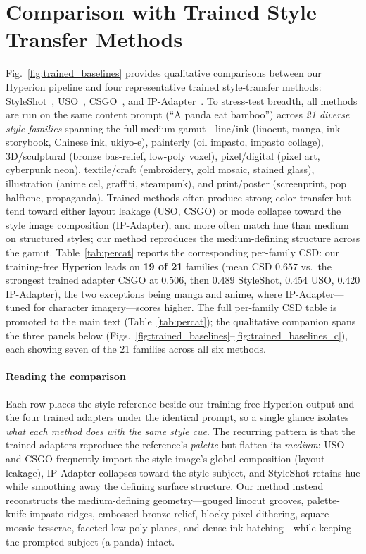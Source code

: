 \section{Comparison with Trained Style Transfer Methods}
\label{app:trained_baselines}

Fig.~\ref{fig:trained_baselines} provides qualitative comparisons between our
Hyperion pipeline and four representative trained style-transfer methods:
StyleShot~\cite{gao2024styleshot}, USO~\cite{wu2025uso},
CSGO~\cite{xing2024csgo}, and IP-Adapter~\cite{ipadapter2023}.
To stress-test breadth, all methods are run on the same content prompt
(``A panda eat bamboo'') across \emph{21 diverse style families} spanning the
full medium gamut---line/ink (linocut, manga, ink-storybook, Chinese ink,
ukiyo-e), painterly (oil impasto, impasto collage), 3D/sculptural (bronze
bas-relief, low-poly voxel), pixel/digital (pixel art, cyberpunk neon),
textile/craft (embroidery, gold mosaic, stained glass), illustration
(anime cel, graffiti, steampunk), and print/poster (screenprint, pop halftone,
propaganda).
Trained methods often produce strong color transfer but tend toward either
layout leakage (USO, CSGO) or mode collapse toward the style image composition
(IP-Adapter), and more often match hue than medium on structured styles; our
method reproduces the medium-defining structure across the gamut.
Table~\ref{tab:percat} reports the corresponding per-family CSD: our
training-free Hyperion leads on \textbf{19 of 21} families (mean CSD $0.657$
vs.\ the strongest trained adapter CSGO at $0.506$, then $0.489$ StyleShot,
$0.454$ USO, $0.420$ IP-Adapter),
the two exceptions being manga and anime, where IP-Adapter---tuned for
character imagery---scores higher. The full per-family CSD table is promoted to
the main text (Table~\ref{tab:percat}); the qualitative companion spans the
three panels below (Figs.~\ref{fig:trained_baselines}--\ref{fig:trained_baselines_c}),
each showing seven of the 21 families across all six methods.

\paragraph{Reading the comparison}
Each row places the style reference beside our training-free Hyperion output and
the four trained adapters under the identical prompt, so a single glance
isolates \emph{what each method does with the same style cue}. The recurring
pattern is that the trained adapters reproduce the reference's \emph{palette}
but flatten its \emph{medium}: USO and CSGO frequently import the style image's
global composition (layout leakage), IP-Adapter collapses toward the style
subject, and StyleShot retains hue while smoothing away the defining surface
structure. Our method instead reconstructs the medium-defining geometry---gouged
linocut grooves, palette-knife impasto ridges, embossed bronze relief, blocky
pixel dithering, square mosaic tesserae, faceted low-poly planes, and dense ink
hatching---while keeping the prompted subject (a panda) intact.

